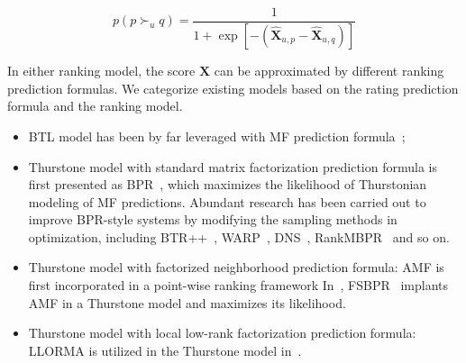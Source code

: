 \documentclass[letterpaper]{article} %
\newcommand{\Rating}{\mathbf{X}}
\begin{document}
\begin{equation}
p(p\succ_u q) = \frac{1} {1+\exp[-(\hat{\Rating}_{u,p}-\hat{\Rating}_{u,q})]}
\end{equation}

In either ranking model, the score $\hat{\Rating}$ can be approximated by different ranking prediction formulas. We categorize existing models based on the rating prediction formula and the ranking model. 
\begin{itemize}
\item BTL model has been by far leveraged with MF prediction formula~\cite{};
\item Thurstone model with standard matrix factorization prediction formula is first presented as BPR~\cite{Rendle2009BPR}, which maximizes the likelihood of Thurstonian modeling of MF predictions. Abundant research has been carried out to improve BPR-style systems by modifying the sampling methods in optimization, including BTR++~\cite{Lerche2014Using}, WARP~\cite{Weston2011Wsabie}, DNS~\cite{Zhang2013Optimizing}, RankMBPR~\cite{Yu2016RankMBPR} and so on.
\item Thurstone model with factorized neighborhood prediction formula: AMF is first incorporated in a point-wise ranking framework In~\cite{Steck2015Gaussian},  FSBPR~\cite{Zhao2018Factored} implants AMF in a Thurstone model and maximizes its likelihood.
\item Thurstone model with local low-rank factorization prediction formula: LLORMA is utilized in the Thurstone model in~\cite{Lee2014Local}.
 \end{itemize}

 



\end{document}
